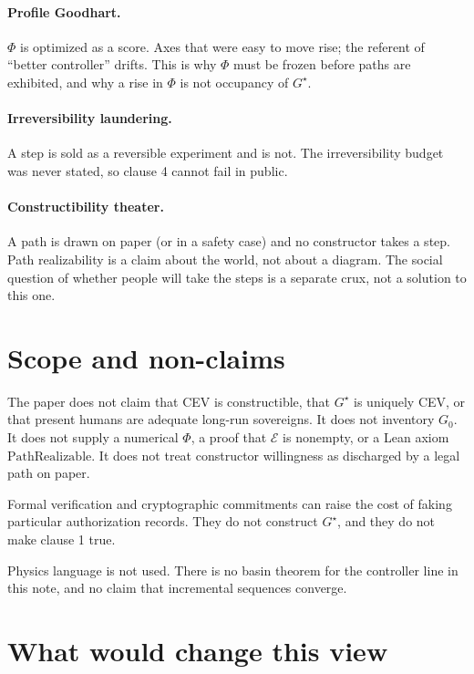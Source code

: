 \documentclass[11pt]{article}
\newcommand{\Eset}{\mathcal{E}}
\begin{document}
\paragraph{Profile Goodhart.}
\(\Phi\) is optimized as a score.
Axes that were easy to move rise; the referent of ``better controller'' drifts.
This is why \(\Phi\) must be frozen before paths are exhibited, and why a rise in \(\Phi\) is not occupancy of \(G^\star\).

\paragraph{Irreversibility laundering.}
A step is sold as a reversible experiment and is not.
The irreversibility budget was never stated, so clause 4 cannot fail in public.

\paragraph{Constructibility theater.}
A path is drawn on paper (or in a safety case) and no constructor takes a step.
Path realizability is a claim about the world, not about a diagram.
The social question of whether people will take the steps is a separate crux, not a solution to this one.

\section{Scope and non-claims}

The paper does not claim that CEV is constructible, that \(G^\star\) is uniquely CEV, or that present humans are adequate long-run sovereigns.
It does not inventory \(G_0\).
It does not supply a numerical \(\Phi\), a proof that \(\Eset\) is nonempty, or a Lean axiom \(\mathrm{PathRealizable}\).
It does not treat constructor willingness as discharged by a legal path on paper.

Formal verification and cryptographic commitments can raise the cost of faking particular authorization records.
They do not construct \(G^\star\), and they do not make clause 1 true.

Physics language is not used.
There is no basin theorem for the controller line in this note, and no claim that incremental sequences converge.

\section{What would change this view}
\end{document}
